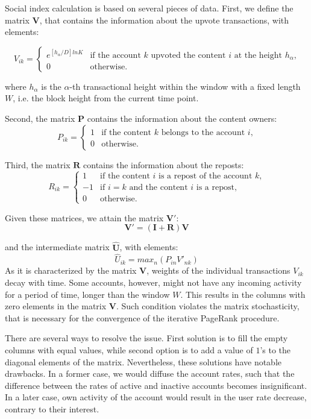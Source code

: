 \documentclass[a4paper,12pt]{article}
\begin{document}
Social index calculation is based on several pieces of data. First, we define the matrix $\boldsymbol{V}$, that contains the information about the upvote transactions, with elements:
	
	$$	
	V_{ik} = \begin{cases}
	 e^{[h_\alpha/D]ln K}
	 & \text{if the account $k$ upvoted the content $i$ at the height $h_\alpha$,}\\
	 0 & \text{otherwise.}
	\end{cases}
	$$
	
	where $h_\alpha$ is the $\alpha$-th transactional height within the window with a fixed length $W$, i.e. the block height from the current time point.
	
	Second, the matrix $\boldsymbol{P}$ contains the information about the content owners:
	$$
	P_{ik} = \begin{cases}
	 1
	 & \text{if the content $k$ belongs to the account $i$,}\\
	 0 & \text{otherwise.}
	\end{cases}
	$$
	
	Third, the matrix $\boldsymbol{R}$ contains the information about the reposts:
	$$
	R_{ik} = \begin{cases}
	 1 & \text{if the content $i$ is a repost of the account $k$,}\\
	 -1 & \text{if $i=k$ and the content $i$ is a repost,}\\
	 0 & \text{otherwise.}
	\end{cases}
	$$
	
	Given these matrices, we attain the matrix $\boldsymbol{V'}$:
	$$
\boldsymbol{V'} = ( \boldsymbol{I} + \boldsymbol{R} ) \boldsymbol{V}
$$
	
	and the intermediate matrix $\boldsymbol{\hat{U}}$, with elements:
	$$
	\hat{U}_{ik} = max_n(P_{in} V'_{nk})
	$$
	As it is characterized by the matrix $\boldsymbol{V}$, weights of the individual transactions $V_{ik}$ decay with time. Some accounts, however, might not have any incoming activity for a period of time, longer than the window $W$. This results in the columns with zero elements in the matrix $\boldsymbol{V}$. Such condition violates the matrix stochasticity, that is necessary for the convergence of the iterative PageRank procedure. 
	
	There are several ways to resolve the issue. First solution is to fill the empty columns with equal values, while second option is to add a value of $1$'s to the diagonal elements of the matrix. Nevertheless, these solutions have notable drawbacks. In a former case, we would diffuse the account rates, such that the difference between the rates of active and inactive accounts becomes insignificant. In a later case, own activity of the account would result in the user rate decrease, contrary to their interest.
	
\end{document}
